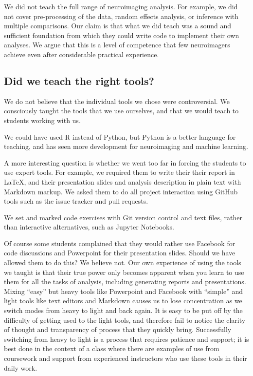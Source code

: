 We did not teach the full range of neuroimaging analysis.  For example, we did
not cover pre-processing of the data, random effects analysis, or inference
with multiple comparisons.   Our claim is that what we did teach was a sound
and sufficient foundation from which they could write code to implement their
own analyses.  We argue that this is a level of competence that few
neuroimagers achieve even after considerable practical experience.

\subsection{Did we teach the right tools?}

We do not believe that the individual tools we chose were controversial. We
consciously taught the tools that we use ourselves, and that we would teach to
students working with us.

We could have used R instead of Python, but Python is a better language for
teaching, and has seen more development for neuroimaging and machine learning.

A more interesting question is whether we went too far in forcing the students
to use expert tools.  For example, we required them to write their their
report in \LaTeX, and their presentation slides and analysis description in
plain text with Markdown markup.  We asked them to do all project interaction
using GitHub tools such as the issue tracker and pull requests.

We set and marked code exercises with Git version control and text files,
rather than interactive alternatives, such as Jupyter Notebooks.

Of course some students complained that they would rather use Facebook for
code discussions and Powerpoint for their presentation slides.
Should we have allowed them to do this?  We believe not.  Our own experience
of using the tools we taught is that their true power only becomes apparent
when you learn to use them for all the tasks of analysis, including generating
reports and presentations.  Mixing ``easy'' but heavy tools like Powerpoint
and Facebook with ``simple'' and light tools like text editors and Markdown
causes us to lose concentration as we switch modes from heavy to light and
back again. It is easy to be put off by the difficulty of getting used to the
light tools, and therefore fail to notice the clarity of thought and
transparency of process that they quickly bring.  Successfully switching from
heavy to light is a process that requires patience and support; it is best
done in the context of a class where there are examples of use from coursework
and support from experienced instructors who use these tools in their daily
work.


